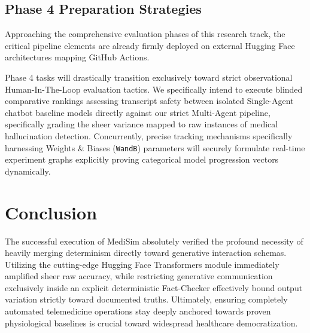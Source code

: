 \documentclass[11pt,a4paper]{article}
\begin{document}
\subsection{Phase 4 Preparation Strategies}
Approaching the comprehensive evaluation phases of this research track, the critical pipeline elements are already firmly deployed on external Hugging Face architectures mapping GitHub Actions. 

Phase 4 tasks will drastically transition exclusively toward strict observational Human-In-The-Loop evaluation tactics. We specifically intend to execute blinded comparative rankings assessing transcript safety between isolated Single-Agent chatbot baseline models directly against our strict Multi-Agent pipeline, specifically grading the sheer variance mapped to raw instances of medical hallucination detection. Concurrently, precise tracking mechanisms specifically harnessing Weights \& Biases (\texttt{WandB}) parameters will securely formulate real-time experiment graphs explicitly proving categorical model progression vectors dynamically.

\section{Conclusion}
The successful execution of MediSim absolutely verified the profound necessity of heavily merging determinism directly toward generative interaction schemas. Utilizing the cutting-edge Hugging Face Transformers module immediately amplified sheer raw accuracy, while restricting generative communication exclusively inside an explicit deterministic Fact-Checker effectively bound output variation strictly toward documented truths. Ultimately, ensuring completely automated telemedicine operations stay deeply anchored towards proven physiological baselines is crucial toward widespread healthcare democratization.


\end{document}
